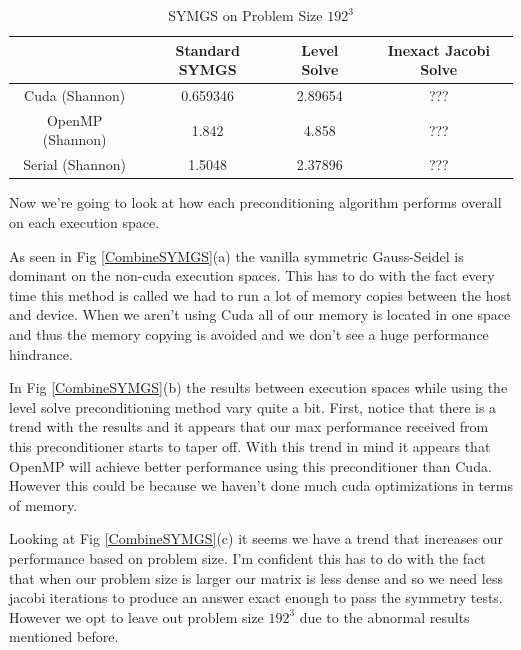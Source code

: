 \documentclass{ccr15}
\begin{document}
\begin{table}[h]
\begin{center}
\begin{tabular}{|c||c|c|c|}
\hline
& Standard SYMGS & Level Solve & Inexact Jacobi Solve \\
\hline \hline
Cuda (Shannon) & 0.659346 & 2.89654 & ??? \\
\hline
OpenMP (Shannon) & 1.842 & 4.858 & ??? \\
\hline
Serial (Shannon) & 1.5048 & 2.37896 & ??? \\
\hline
\end{tabular}
\caption{SYMGS on Problem Size $192^3$}
\label{SYMGS192}
\end{center}
\end{table}

Now we're going to look at how each preconditioning algorithm performs overall on each execution
space.

As seen in Fig \ref{CombineSYMGS}(a) the vanilla symmetric Gauss-Seidel is dominant on the non-cuda
execution spaces. This has to do with the fact every time this method is called we had to run
a lot of memory copies between the host and device. When we aren't using Cuda all of our memory
is located in one space and thus the memory copying is avoided and we don't see a huge
performance hindrance.

In Fig \ref{CombineSYMGS}(b) the results between execution spaces while using the level solve
preconditioning method vary quite a bit. First, notice that there is a trend with the results and
it appears that our max performance received from this preconditioner starts to taper off. With
this trend in mind it appears that OpenMP will achieve better performance using this
preconditioner than Cuda. However this could be because we haven't done much cuda optimizations
in terms of memory.

Looking at Fig \ref{CombineSYMGS}(c) it seems we have a trend that increases our performance based on
problem size. I'm confident this has to do with the fact that when our problem size is larger our
matrix is less dense and so we need less jacobi iterations to produce an answer exact enough to
pass the symmetry tests. However we opt to leave out problem size $192^3$ due to the abnormal
results mentioned before.
\end{document}
